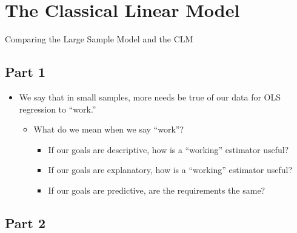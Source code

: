 \documentclass[
]{book}
\providecommand{\tightlist}{%
  \setlength{\itemsep}{0pt}\setlength{\parskip}{0pt}}
\theoremstyle{definition}
\theoremstyle{definition}
\theoremstyle{definition}
\theoremstyle{definition}
\theoremstyle{remark}
\begin{document}
\section{The Classical Linear Model}\label{the-classical-linear-model-1}

Comparing the Large Sample Model and the CLM

\subsection{Part 1}\label{part-1-1}

\begin{itemize}
\tightlist
\item
  We say that in small samples, more needs be true of our data for OLS regression to ``work.''

  \begin{itemize}
  \tightlist
  \item
    What do we mean when we say ``work''?

    \begin{itemize}
    \tightlist
    \item
      If our goals are descriptive, how is a ``working'' estimator useful?
    \item
      If our goals are explanatory, how is a ``working'' estimator useful?
    \item
      If our goals are predictive, are the requirements the same?
    \end{itemize}
  \end{itemize}
\end{itemize}

\subsection{Part 2}\label{part-2-1}
\end{document}
